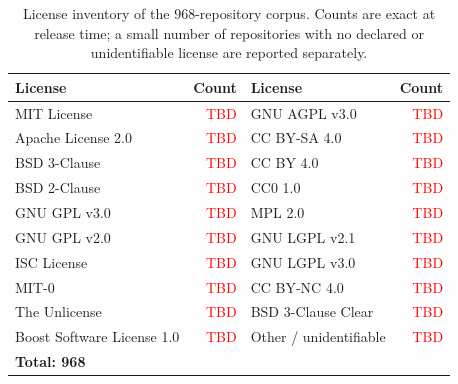 \begin{table}[h]
\centering
\caption{License inventory of the $968$-repository corpus. Counts are
exact at release time; a small number of repositories with no declared
or unidentifiable license are reported separately.}
\label{tab:licenses}
\small
\setlength{\tabcolsep}{6pt}
\begin{tabular}{lr|lr}
\toprule
License & Count & License & Count \\
\midrule
MIT License                                     & \textcolor{red}{TBD} & GNU AGPL v3.0                                  & \textcolor{red}{TBD} \\
Apache License 2.0                              & \textcolor{red}{TBD} & CC BY-SA 4.0                                   & \textcolor{red}{TBD} \\
BSD 3-Clause                                    & \textcolor{red}{TBD} & CC BY 4.0                                      & \textcolor{red}{TBD} \\
BSD 2-Clause                                    & \textcolor{red}{TBD} & CC0 1.0                                        & \textcolor{red}{TBD} \\
GNU GPL v3.0                                    & \textcolor{red}{TBD} & MPL 2.0                                        & \textcolor{red}{TBD} \\
GNU GPL v2.0                                    & \textcolor{red}{TBD} & GNU LGPL v2.1                                  & \textcolor{red}{TBD} \\
ISC License                                     & \textcolor{red}{TBD} & GNU LGPL v3.0                                  & \textcolor{red}{TBD} \\
MIT-0                                           & \textcolor{red}{TBD} & CC BY-NC 4.0                                   & \textcolor{red}{TBD} \\
The Unlicense                                   & \textcolor{red}{TBD} & BSD 3-Clause Clear                             & \textcolor{red}{TBD} \\
Boost Software License 1.0                      & \textcolor{red}{TBD} & Other / unidentifiable                         & \textcolor{red}{TBD} \\
\midrule
\multicolumn{4}{l}{\textbf{Total: 968}} \\
\bottomrule
\end{tabular}
\end{table}

